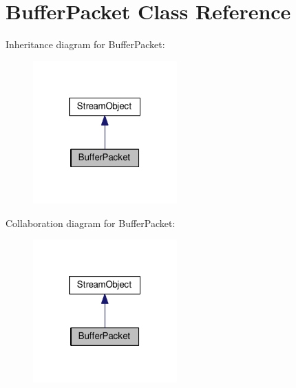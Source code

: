 \hypertarget{class_buffer_packet}{}\section{Buffer\+Packet Class Reference}
\label{class_buffer_packet}


Inheritance diagram for Buffer\+Packet\+:\nopagebreak
\begin{figure}[H]
\begin{center}
\leavevmode
\includegraphics[width=157pt]{class_buffer_packet__inherit__graph}
\end{center}
\end{figure}


Collaboration diagram for Buffer\+Packet\+:\nopagebreak
\begin{figure}[H]
\begin{center}
\leavevmode
\includegraphics[width=157pt]{class_buffer_packet__coll__graph}
\end{center}
\end{figure}
